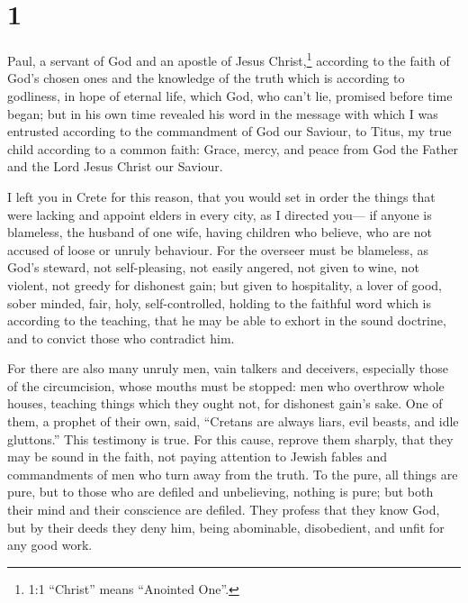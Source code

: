 \hypertarget{section}{%
\section{1}\label{section}}

 Paul, a servant of God and an apostle of Jesus
Christ,\footnote{1:1 ``Christ'' means ``Anointed One''.} according to
the faith of God's chosen ones and the knowledge of the truth which is
according to godliness,  in hope of eternal life, which God,
who can't lie, promised before time began;  but in his own
time revealed his word in the message with which I was entrusted
according to the commandment of God our Saviour,  to Titus,
my true child according to a common faith: Grace, mercy, and peace from
God the Father and the Lord Jesus Christ our Saviour.

 I left you in Crete for this reason, that you would set in
order the things that were lacking and appoint elders in every city, as
I directed you---  if anyone is blameless, the husband of
one wife, having children who believe, who are not accused of loose or
unruly behaviour.  For the overseer must be blameless, as
God's steward, not self-pleasing, not easily angered, not given to wine,
not violent, not greedy for dishonest gain;  but given to
hospitality, a lover of good, sober minded, fair, holy, self-controlled,
 holding to the faithful word which is according to the
teaching, that he may be able to exhort in the sound doctrine, and to
convict those who contradict him.

 For there are also many unruly men, vain talkers and
deceivers, especially those of the circumcision,  whose
mouths must be stopped: men who overthrow whole houses, teaching things
which they ought not, for dishonest gain's sake.  One of
them, a prophet of their own, said, ``Cretans are always liars, evil
beasts, and idle gluttons.''  This testimony is true. For
this cause, reprove them sharply, that they may be sound in the faith,
 not paying attention to Jewish fables and commandments of
men who turn away from the truth.  To the pure, all things
are pure, but to those who are defiled and unbelieving, nothing is pure;
but both their mind and their conscience are defiled.  They
profess that they know God, but by their deeds they deny him, being
abominable, disobedient, and unfit for any good work.

